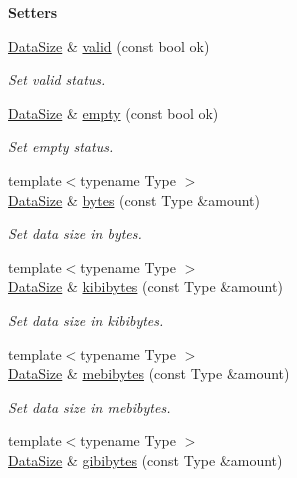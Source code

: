 \begin{Indent}{\bf Setters}\par
\begin{DoxyCompactItemize}
\item 
\hyperlink{exceptionmagrathea_1_1DataSize}{Data\-Size} \& \hyperlink{exceptionmagrathea_1_1DataSize_a0922e436ed67e5a0e85f0fea8755f2e7}{valid} (const bool ok)
\begin{DoxyCompactList}\small\item\em Set valid status. \end{DoxyCompactList}\item 
\hyperlink{exceptionmagrathea_1_1DataSize}{Data\-Size} \& \hyperlink{exceptionmagrathea_1_1DataSize_ad8673f77d6f7d3b6eec25119c1197faf}{empty} (const bool ok)
\begin{DoxyCompactList}\small\item\em Set empty status. \end{DoxyCompactList}\item 
{\footnotesize template$<$typename Type $>$ }\\\hyperlink{exceptionmagrathea_1_1DataSize}{Data\-Size} \& \hyperlink{exceptionmagrathea_1_1DataSize_aa174ec78a569c35df04960bf3d38e2d4}{bytes} (const Type \&amount)
\begin{DoxyCompactList}\small\item\em Set data size in bytes. \end{DoxyCompactList}\item 
{\footnotesize template$<$typename Type $>$ }\\\hyperlink{exceptionmagrathea_1_1DataSize}{Data\-Size} \& \hyperlink{exceptionmagrathea_1_1DataSize_a073c8dfc183b69e288b7a58cd723cffe}{kibibytes} (const Type \&amount)
\begin{DoxyCompactList}\small\item\em Set data size in kibibytes. \end{DoxyCompactList}\item 
{\footnotesize template$<$typename Type $>$ }\\\hyperlink{exceptionmagrathea_1_1DataSize}{Data\-Size} \& \hyperlink{exceptionmagrathea_1_1DataSize_a71997eeb607319792486bac384fb6329}{mebibytes} (const Type \&amount)
\begin{DoxyCompactList}\small\item\em Set data size in mebibytes. \end{DoxyCompactList}\item 
{\footnotesize template$<$typename Type $>$ }\\\hyperlink{exceptionmagrathea_1_1DataSize}{Data\-Size} \& \hyperlink{exceptionmagrathea_1_1DataSize_ae2798b09fa832ffe0d213fcb78fd01ff}{gibibytes} (const Type \&amount)

\end{DoxyCompactItemize}
\end{Indent}
